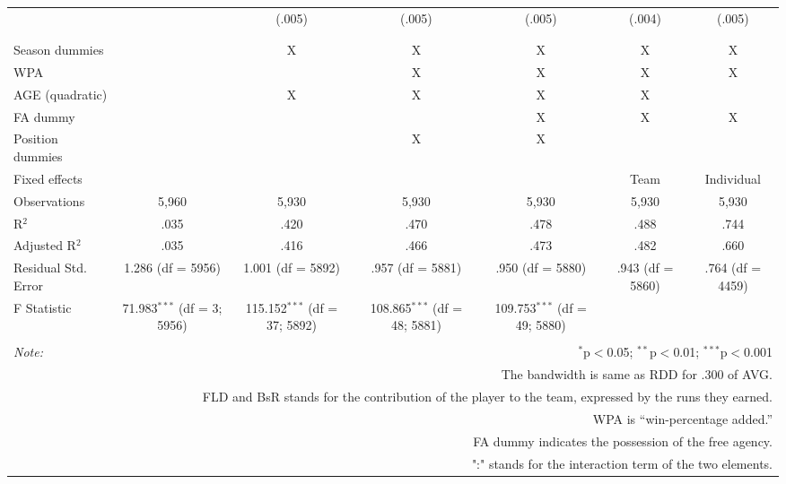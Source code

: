 \begin{table}[H]
\begin{tabular}{@{\extracolsep{5pt}}lcccccc}
  &  & (.005) & (.005) & (.005) & (.004) & (.005) \\
  & & & & & & \\
\hline \\[-1.8ex]
Season dummies &  & X & X & X & X & X \\
WPA & & & X & X & X & X  \\
AGE (quadratic) &  & X & X & X & X &  \\
FA dummy &  &  &  & X & X & X \\
Position dummies &  &  & X & X &  &  \\
Fixed effects &  &  &  &  & Team & Individual \\
Observations & 5,960 & 5,930 & 5,930 & 5,930 & 5,930 & 5,930 \\
R$^{2}$ & .035 & .420 & .470 & .478 & .488 & .744 \\
Adjusted R$^{2}$ & .035 & .416 & .466 & .473 & .482 & .660 \\
Residual Std. Error & 1.286 (df = 5956) & 1.001 (df = 5892) & .957 (df = 5881) & .950 (df = 5880) & .943 (df = 5860) & .764 (df = 4459) \\
F Statistic & 71.983$^{***}$ (df = 3; 5956) & 115.152$^{***}$ (df = 37; 5892) & 108.865$^{***}$ (df = 48; 5881) & 109.753$^{***}$ (df = 49; 5880) &  &  \\
\hline
\hline \\[-1.8ex]
\textit{Note:}  & \multicolumn{6}{r}{$^{*}$p$<$0.05; $^{**}$p$<$0.01; $^{***}$p$<$0.001} \\
& \multicolumn{6}{r}{The bandwidth is same as RDD for .300 of AVG.} \\
& \multicolumn{6}{r}{FLD and BsR stands for the contribution of the player to the team, expressed by the runs they earned.} \\
& \multicolumn{6}{r}{WPA is ``win-percentage added.''} \\
& \multicolumn{6}{r}{FA dummy indicates the possession of the free agency.}\\
& \multicolumn{6}{r}{":" stands for the interaction term of the two elements.} \\
\end{tabular}
\end{table}
